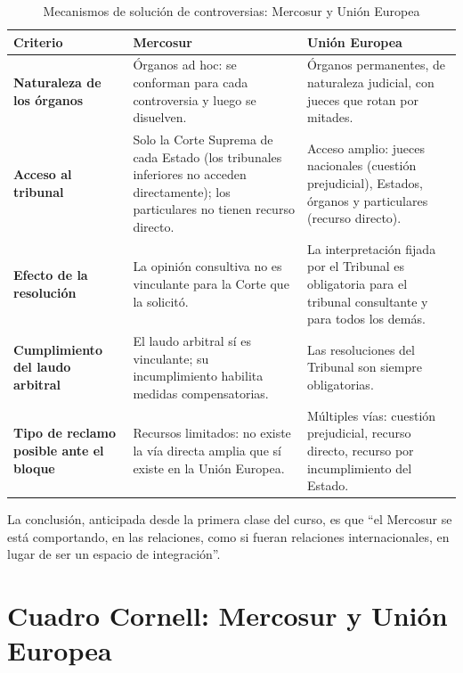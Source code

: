 \documentclass[12pt,oneside]{book}
\begin{document}
\begin{table}[H]
\centering
\caption{Mecanismos de solución de controversias: Mercosur y Unión Europea}
\renewcommand{\arraystretch}{1.25}
\begin{tabularx}{\textwidth}{
    >{\raggedright\arraybackslash}p{}
    >{\raggedright\arraybackslash}X
    >{\raggedright\arraybackslash}X
}
\toprule
\textbf{Criterio} & \textbf{Mercosur} & \textbf{Unión Europea} \\
\midrule
\textbf{Naturaleza de los órganos} &
Órganos ad hoc: se conforman para cada controversia y luego se disuelven. &
Órganos permanentes, de naturaleza judicial, con jueces que rotan por mitades. \\
\addlinespace
\textbf{Acceso al tribunal} &
Solo la Corte Suprema de cada Estado (los tribunales inferiores no acceden directamente); los particulares no tienen recurso directo. &
Acceso amplio: jueces nacionales (cuestión prejudicial), Estados, órganos y particulares (recurso directo). \\
\addlinespace
\textbf{Efecto de la resolución} &
La opinión consultiva no es vinculante para la Corte que la solicitó. &
La interpretación fijada por el Tribunal es obligatoria para el tribunal consultante y para todos los demás. \\
\addlinespace
\textbf{Cumplimiento del laudo arbitral} &
El laudo arbitral sí es vinculante; su incumplimiento habilita medidas compensatorias. &
Las resoluciones del Tribunal son siempre obligatorias. \\
\addlinespace
\textbf{Tipo de reclamo posible ante el bloque} &
Recursos limitados: no existe la vía directa amplia que sí existe en la Unión Europea. &
Múltiples vías: cuestión prejudicial, recurso directo, recurso por incumplimiento del Estado. \\
\bottomrule
\end{tabularx}
\end{table}

La conclusión, anticipada desde la primera clase del curso, es que “el Mercosur se está comportando, en las relaciones, como si fueran relaciones internacionales, en lugar de ser un espacio de integración”.

\section{Cuadro Cornell: Mercosur y Unión Europea}
\end{document}
